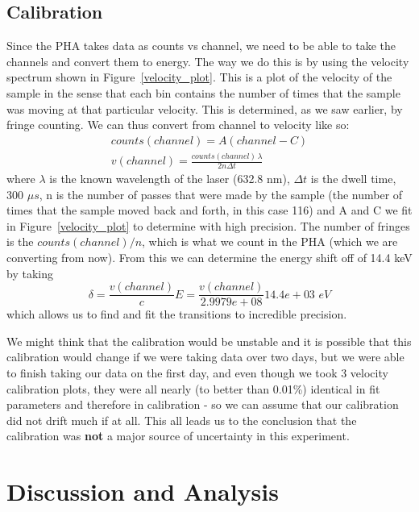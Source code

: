 \documentclass[reprint, nobibnotes, amssymb, amsmath, amsfonts, mathtools, mathrsfs, floatfix]{revtex4-1}
\begin{document}
    \subsection{Calibration}
      Since the PHA takes data as counts vs channel, we need to be able to take the channels and convert them to energy.  The way we do this is by using the velocity spectrum shown in Figure~\ref{velocity_plot}.  This is a plot of the velocity of the sample in the sense that each bin contains the number of times that the sample was moving at that particular velocity.  This is determined, as we saw earlier, by fringe counting.  We can thus convert from channel to velocity like so:
      \begin{gather}
        counts(channel) = A(channel - C) \\
        v(channel) = \frac{counts(channel)\,\lambda}{2 n \Delta t} \label{calibration}
      \end{gather}
      where $\lambda$ is the known wavelength of the laser (632.8 nm), $\Delta t$ is the dwell time, 300 $\mu s$, n is the number of passes that were made by the sample (the number of times that the sample moved back and forth, in this case 116) and A and C we fit in Figure~\ref{velocity_plot} to determine with high precision.  The number of fringes is the $counts(channel)/n$, which is what we count in the PHA (which we are converting from now).  From this we can determine the energy shift off of 14.4 keV by taking
      \begin{equation}
        \delta = \frac{v(channel)}{c}E = \frac{v(channel)}{2.9979e+08} 14.4e+03\,\,eV \label{vel_to_energy}
      \end{equation}
      which allows us to find and fit the transitions to incredible precision.

      We might think that the calibration would be unstable and it is possible that this calibration would change if we were taking data over two days, but we were able to finish taking our data on the first day, and even though we took 3 velocity calibration plots, they were all nearly (to better than 0.01\%) identical in fit parameters and therefore in calibration - so we can assume that our calibration did not drift much if at all.  This all leads us to the conclusion that the calibration was \textbf{not} a major source of uncertainty in this experiment.

  \section{Discussion and Analysis}
\end{document}
